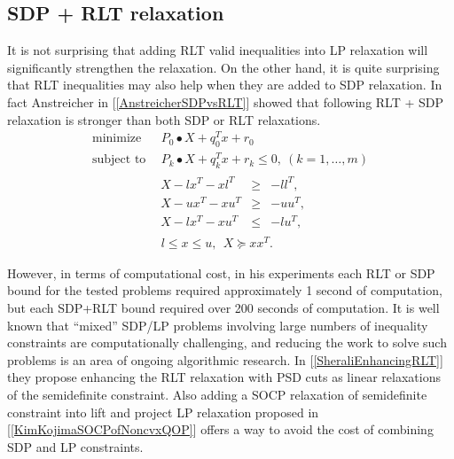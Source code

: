\documentclass[12pt]{book}
\theoremstyle{definition}
\begin{document}
\subsection{SDP + RLT relaxation}
It is not surprising that adding RLT valid inequalities into LP relaxation will significantly strengthen the relaxation. 
On the other hand, it is quite surprising that RLT inequalities may also help when they are added to SDP relaxation. 
In fact Anstreicher in [\ref{AnstreicherSDPvsRLT}] showed that following RLT + SDP relaxation is stronger than both SDP or RLT relaxations.
 \begin{equation}
\label{SDP+RLTrelax1} 
\begin{array}{ll}
\mbox{minimize}&\ \ P_0\bullet X + q_0^Tx + r_0\\
\mbox{subject to}&\ \ P_k\bullet X+ q_k^Tx + r_k \leq 0, \  (k = 1,\dots ,m)\\
		& \begin{array}{lcl}
		 X - lx^T - xl^T & \geq & -ll^T, \\
		 X - ux^T - xu^T & \geq & -uu^T, \\
		 X - lx^T - xu^T & \leq & -lu^T, 
		 \end{array}\\
 		&\ \ l\leq x \leq u, \ \  X \succeq xx^T.
\end{array} 
\end{equation}

However, in terms of computational cost, in his experiments each RLT or SDP bound for the tested problems required approximately 1
second of computation, but each SDP+RLT bound required over 200 seconds of computation. It
is well known that “mixed” SDP/LP problems involving large numbers of inequality constraints
are computationally challenging, and reducing the work to solve such problems is an area of ongoing
algorithmic research. In [\ref{SheraliEnhancingRLT}] they propose enhancing the RLT relaxation with PSD cuts as linear relaxations of the semidefinite constraint. Also adding a SOCP relaxation of semidefinite constraint into lift and project LP relaxation proposed in [\ref{KimKojimaSOCPofNoncvxQOP}] offers a way to avoid the cost of combining SDP and LP constraints.
\end{document}
